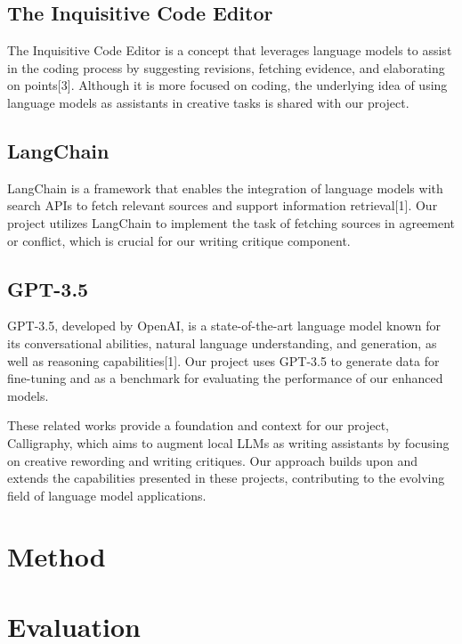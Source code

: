 \documentclass{article}
\begin{document}
\subsection{The Inquisitive Code Editor}

The Inquisitive Code Editor is a concept that leverages language models to assist in the coding process by suggesting revisions, fetching evidence, and elaborating on points[3]. Although it is more focused on coding, the underlying idea of using language models as assistants in creative tasks is shared with our project.

\subsection{LangChain}

LangChain is a framework that enables the integration of language models with search APIs to fetch relevant sources and support information retrieval[1]. Our project utilizes LangChain to implement the task of fetching sources in agreement or conflict, which is crucial for our writing critique component.

\subsection{GPT-3.5}

GPT-3.5, developed by OpenAI, is a state-of-the-art language model known for its conversational abilities, natural language understanding, and generation, as well as reasoning capabilities[1]. Our project uses GPT-3.5 to generate data for fine-tuning and as a benchmark for evaluating the performance of our enhanced models.

These related works provide a foundation and context for our project, Calligraphy, which aims to augment local LLMs as writing assistants by focusing on creative rewording and writing critiques. Our approach builds upon and extends the capabilities presented in these projects, contributing to the evolving field of language model applications.

\section{Method}
\label{method}




\section{Evaluation}
\label{eval}
\end{document}
